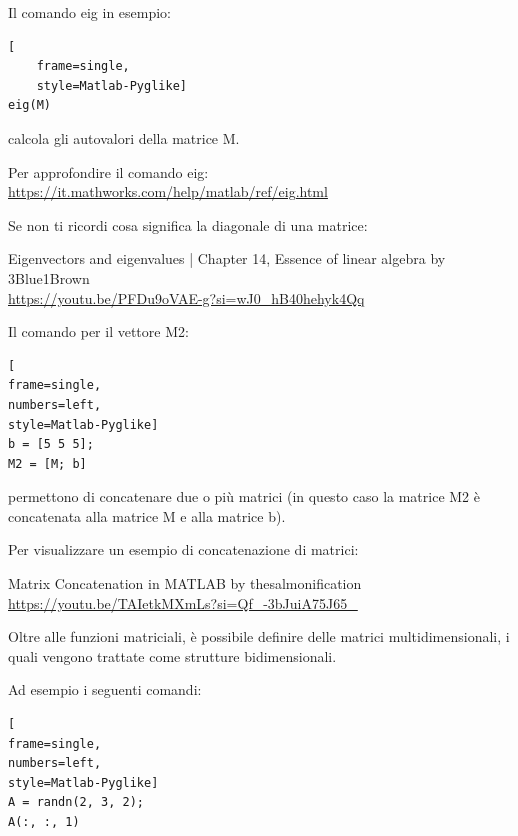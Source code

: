 Il comando eig in esempio: 

\begin{lstlisting}[
    frame=single,
    style=Matlab-Pyglike]
eig(M)  
\end{lstlisting}

calcola gli autovalori della matrice M. \newline 

\begin{tcolorbox}

    Per approfondire il comando eig: \url{https://it.mathworks.com/help/matlab/ref/eig.html}\newline 

    Se non ti ricordi cosa significa la diagonale di una matrice: \newline 

   Eigenvectors and eigenvalues | Chapter 14, Essence of linear algebra by 3Blue1Brown \\ 
   \url{https://youtu.be/PFDu9oVAE-g?si=wJ0_hB40hehyk4Qq}
\end{tcolorbox} 

Il comando per il vettore M2: 

\begin{lstlisting}[
frame=single,
numbers=left,
style=Matlab-Pyglike]
b = [5 5 5]; 
M2 = [M; b]
\end{lstlisting}

permettono di concatenare due o più matrici (in questo caso la matrice M2 è concatenata alla matrice M e alla matrice b). \newline 

\begin{tcolorbox}
    Per visualizzare un esempio di concatenazione di matrici: \newline 

    Matrix Concatenation in MATLAB by thesalmonification \\ 
    \url{https://youtu.be/TAIetkMXmLs?si=Qf_-3bJuiA75J65_}
\end{tcolorbox}

Oltre alle funzioni matriciali, è possibile definire delle matrici multidimensionali, 
i quali vengono trattate come strutture bidimensionali. \newline 

Ad esempio i seguenti comandi: 

\begin{lstlisting}[
frame=single,
numbers=left,
style=Matlab-Pyglike]
A = randn(2, 3, 2); 
A(:, :, 1)
\end{lstlisting}

